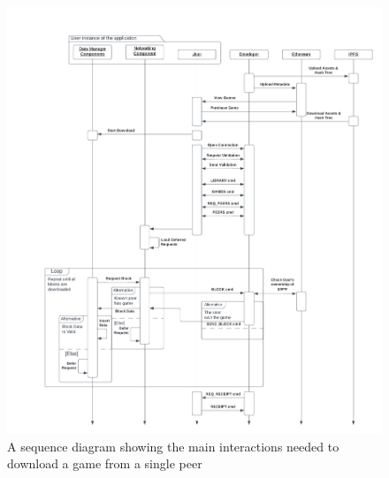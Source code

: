 \begin{figure}[!ht]
  \centering
  \includegraphics[width=\textwidth]{assets/images/diagrams/p2p-sequence.png}
  \caption{A sequence diagram showing the main interactions needed to download a game from a single peer}
  \label{fig:p2p-interactions}
\end{figure}

